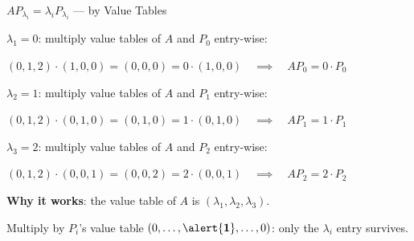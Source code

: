 \documentclass[10pt]{beamer}
\theoremstyle{definition}
\newcommand{\x}[1]{\alert{\textbf{#1}}}
\begin{document}
%
\begin{frame}{$A P_{\lambda_i} = \lambda_i P_{\lambda_i}$ --- by Value Tables}

\x{$\lambda_1 = 0$}: \; multiply value tables of $A$ and $P_0$ entry-wise:

$(0,1,2) \cdot (1,0,0) = (0,0,0) = 0 \cdot (1,0,0) \quad\implies\quad A P_0 = 0 \cdot P_0$ \;\checkmark

\vfill\pause

\x{$\lambda_2 = 1$}: \; multiply value tables of $A$ and $P_1$ entry-wise:

$(0,1,2) \cdot (0,1,0) = (0,1,0) = 1 \cdot (0,1,0) \quad\implies\quad A P_1 = 1 \cdot P_1$ \;\checkmark

\vfill\pause

\x{$\lambda_3 = 2$}: \; multiply value tables of $A$ and $P_2$ entry-wise:

$(0,1,2) \cdot (0,0,1) = (0,0,2) = 2 \cdot (0,0,1) \quad\implies\quad A P_2 = 2 \cdot P_2$ \;\checkmark

\vfill

\x{Why it works}: the value table of $A$ is $(\lambda_1, \lambda_2, \lambda_3)$.

Multiply by $P_i$'s value table $(0,\ldots, \x{1}, \ldots, 0)$: only the $\lambda_i$ entry survives.

\end{frame}
\end{document}
